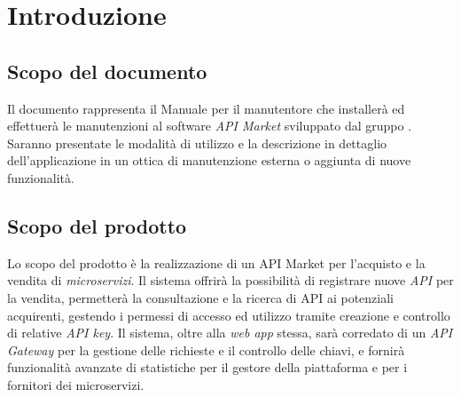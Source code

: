 \newpage
\section{Introduzione}

\subsection{Scopo del documento}
Il documento rappresenta il Manuale per il manutentore che installerà ed effettuerà le manutenzioni al software \textit{API Market} sviluppato dal gruppo \gruppo. Saranno presentate le modalità di utilizzo e la descrizione in dettaglio dell'applicazione in un ottica di manutenzione esterna o aggiunta di nuove funzionalità.

\subsection{Scopo del prodotto}
Lo scopo del prodotto è la realizzazione di un API Market per l'acquisto e la vendita di \textit{microservizi}. Il sistema offrirà la possibilità di registrare nuove \textit{API} per la vendita, permetterà la consultazione e la ricerca di API ai potenziali acquirenti, gestendo i permessi di accesso ed utilizzo tramite creazione e controllo di relative \textit{API key}. Il sistema, oltre alla \textit{web app} stessa, sarà corredato di un \textit{API Gateway} per la gestione delle richieste e il controllo delle chiavi, e fornirà funzionalità avanzate di statistiche per il gestore della piattaforma e per i fornitori dei microservizi.


